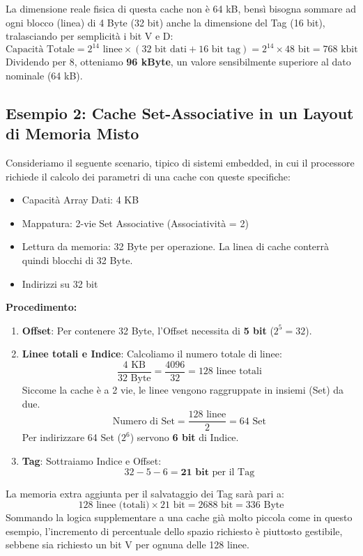 La dimensione reale fisica di questa cache non è 64 kB, bensì bisogna sommare ad ogni blocco (linea) di 4 Byte (32 bit) anche la dimensione del Tag (16 bit), tralasciando per semplicità i bit V e D:
\[ \text{Capacità Totale} = 2^{14} \text{ linee} \times (32 \text{ bit dati} + 16 \text{ bit tag}) = 2^{14} \times 48 \text{ bit} = 768 \text{ kbit} \]
Dividendo per 8, otteniamo \textbf{96 kByte}, un valore sensibilmente superiore al dato nominale (64 kB).

\subsection{Esempio 2: Cache Set-Associative in un Layout di Memoria Misto}
Consideriamo il seguente scenario, tipico di sistemi embedded, in cui il processore richiede il calcolo dei parametri di una cache con queste specifiche:
\begin{itemize}
    \item Capacità Array Dati: 4 KB
    \item Mappatura: 2-vie Set Associative (Associatività = 2)
    \item Lettura da memoria: 32 Byte per operazione. La linea di cache conterrà quindi blocchi di 32 Byte.
    \item Indirizzi su 32 bit
\end{itemize}


\textbf{Procedimento:}
\begin{enumerate}
    \item \textbf{Offset}: Per contenere 32 Byte, l'Offset necessita di \textbf{5 bit} ($2^5 = 32$).
    \item \textbf{Linee totali e Indice}: Calcoliamo il numero totale di linee:
    \[ \frac{4 \text{ KB}}{32 \text{ Byte}} = \frac{4096}{32} = 128 \text{ linee totali} \]
    Siccome la cache è a 2 vie, le linee vengono raggruppate in insiemi (Set) da due.
    \[ \text{Numero di Set} = \frac{128 \text{ linee}}{2} = 64 \text{ Set} \]
    Per indirizzare 64 Set ($2^6$) servono \textbf{6 bit} di Indice.
    \item \textbf{Tag}: Sottraiamo Indice e Offset:
    \[ 32 - 5 - 6 = \textbf{21 bit} \text{ per il Tag} \]
\end{enumerate}
La memoria extra aggiunta per il salvataggio dei Tag sarà pari a:
\[ 128 \text{ linee (totali)} \times 21 \text{ bit} = 2688 \text{ bit} = 336 \text{ Byte} \]
Sommando la logica supplementare a una cache già molto piccola come in questo esempio, l'incremento di percentuale dello spazio richiesto è piuttosto gestibile, sebbene sia richiesto un bit V per ognuna delle 128 linee.

